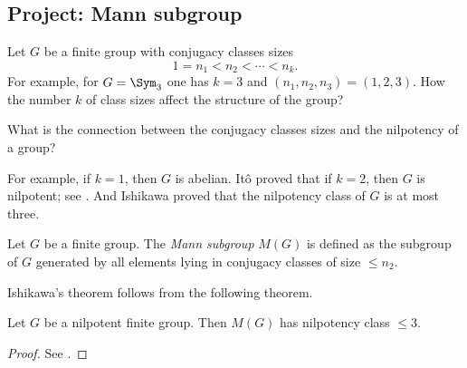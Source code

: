 \subsection{Project: Mann subgroup}

Let $G$ be a finite group with conjugacy classes sizes 
\[
1=n_1<n_2<\cdots<n_k.
\]
For example, for $G=\Sym_3$ one has $k=3$ and $(n_1,n_2,n_3)=(1,2,3)$. How the number $k$ of class sizes affect the structure of the group?

\begin{problem}
    What is the connection between the conjugacy classes sizes and the nilpotency of a group? 
\end{problem}

For example, if $k=1$, then $G$ is abelian. 
It\^o proved that if $k=2$, then $G$ is nilpotent; see \cite{MR61597}. 
And Ishikawa proved that the nilpotency class of $G$ is at most three. 

\begin{definition}
    Let $G$ be a finite group. The \emph{Mann subgroup} $M(G)$ is defined as the subgroup
    of $G$ generated by all elements lying in conjugacy classes of size $\leq n_2$.
\end{definition}

Ishikawa's theorem
follows from the following theorem. 

\begin{theorem}[Mann]
\label{thm:Mann}
Let $G$ be a nilpotent finite group. Then $M(G)$ has nilpotency class $\leq3$.
\end{theorem}

\begin{proof}
    See \cite[Theorem 4.14]{MR2426855}.
\end{proof}

